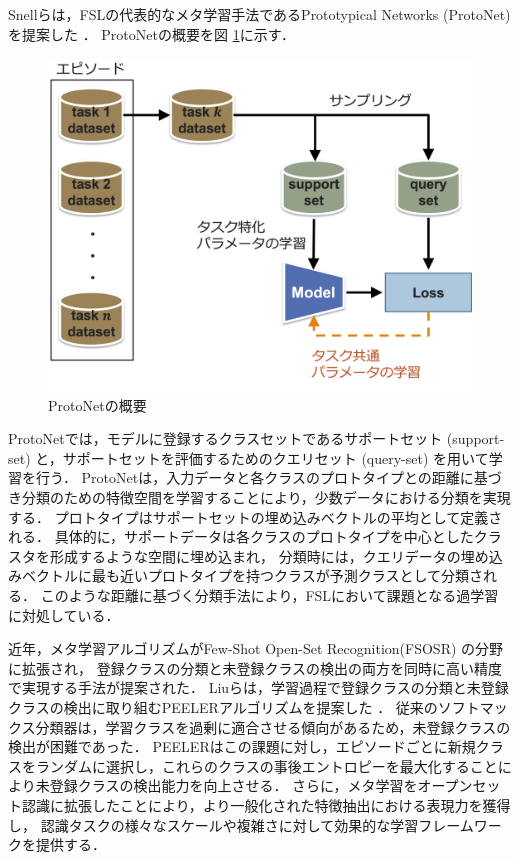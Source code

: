 \documentclass[a4paper,11pt,nomag]{jsreport}
\begin{document}
Snellらは，FSLの代表的なメタ学習手法であるPrototypical Networks (ProtoNet) を提案した \cite{protonet}．
ProtoNetの概要を図 \ref{fig:protonet}に示す．
% 
\begin{figure}[tbp]
  \centering
  \includegraphics[width=0.7\linewidth, keepaspectratio]{image/protonet.png}
  \caption{ProtoNetの概要}
  \label{fig:protonet}
\end{figure}
% 
ProtoNetでは，モデルに登録するクラスセットであるサポートセット (support-set) と，サポートセットを評価するためのクエリセット (query-set) を用いて学習を行う．
ProtoNetは，入力データと各クラスのプロトタイプとの距離に基づき分類のための特徴空間を学習することにより，少数データにおける分類を実現する．
プロトタイプはサポートセットの埋め込みベクトルの平均として定義される．
具体的に，サポートデータは各クラスのプロトタイプを中心としたクラスタを形成するような空間に埋め込まれ，
分類時には，クエリデータの埋め込みベクトルに最も近いプロトタイプを持つクラスが予測クラスとして分類される．
このような距離に基づく分類手法により，FSLにおいて課題となる過学習に対処している．

近年，メタ学習アルゴリズムがFew-Shot Open-Set Recognition(FSOSR) の分野に拡張され，
登録クラスの分類と未登録クラスの検出の両方を同時に高い精度で実現する手法が提案された．
Liuらは，学習過程で登録クラスの分類と未登録クラスの検出に取り組むPEELERアルゴリズムを提案した \cite{peeler}．
従来のソフトマックス分類器は，学習クラスを過剰に適合させる傾向があるため，未登録クラスの検出が困難であった．
PEELERはこの課題に対し，エピソードごとに新規クラスをランダムに選択し，これらのクラスの事後エントロピーを最大化することにより未登録クラスの検出能力を向上させる．
さらに，メタ学習をオープンセット認識に拡張したことにより，より一般化された特徴抽出における表現力を獲得し，
認識タスクの様々なスケールや複雑さに対して効果的な学習フレームワークを提供する．
\end{document}
